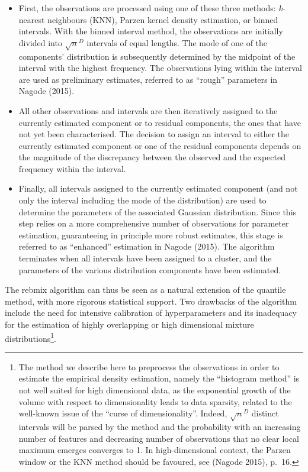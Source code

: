 \begin{itemize}
  \begin{itemize}
  \tightlist
  \item
    First, the observations are processed using one of these three methods: \emph{k}-nearest neighbours (KNN), Parzen kernel density estimation, or binned intervals. With the binned interval method, the observations are initially divided into \(\sqrt{n}^D\) intervals of equal lengths. The mode of one of the components' distribution is subsequently determined by the midpoint of the interval with the highest frequency. The observations lying within the interval are used as preliminary estimates, referred to as ``rough'' parameters in Nagode (2015).
  \item
    All other observations and intervals are then iteratively assigned to the currently estimated component or to residual components, the ones that have not yet been characterised. The decision to assign an interval to either the currently estimated component or one of the residual components depends on the magnitude of the discrepancy between the observed and the expected frequency within the interval.
  \item
    Finally, all intervals assigned to the currently estimated component (and not only the interval including the mode of the distribution) are used to determine the parameters of the associated Gaussian distribution. Since this step relies on a more comprehensive number of observations for parameter estimation, guaranteeing in principle more robust estimates, this stage is referred to as ``enhanced'' estimation in Nagode (2015). The algorithm terminates when all intervals have been assigned to a cluster, and the parameters of the various distribution components have been estimated.
  \end{itemize}
\end{itemize}

The rebmix algorithm can thus be seen as a natural extension of the quantile method, with more rigorous statistical support. Two drawbacks of the algorithm include the need for intensive calibration of hyperparameters and its inadequacy for the estimation of highly overlapping or high dimensional mixture distributions\footnote{The method we describe here to preprocess the observations in order to estimate the empirical density estimation, namely the ``histogram method'' is not well suited for high dimensional data, as the exponential growth of the volume with respect to dimensionality leads to data sparsity, related to the well-known issue of the ``curse of dimensionality''. Indeed, \(\sqrt{n}^D\) distinct intervals will be parsed by the method and the probability with an increasing number of features and decreasing number of observations that no clear local maximum emerges converges to 1. In high-dimensional context, the Parzen window or the KNN method should be favoured, see (Nagode 2015), p.~16.}.

